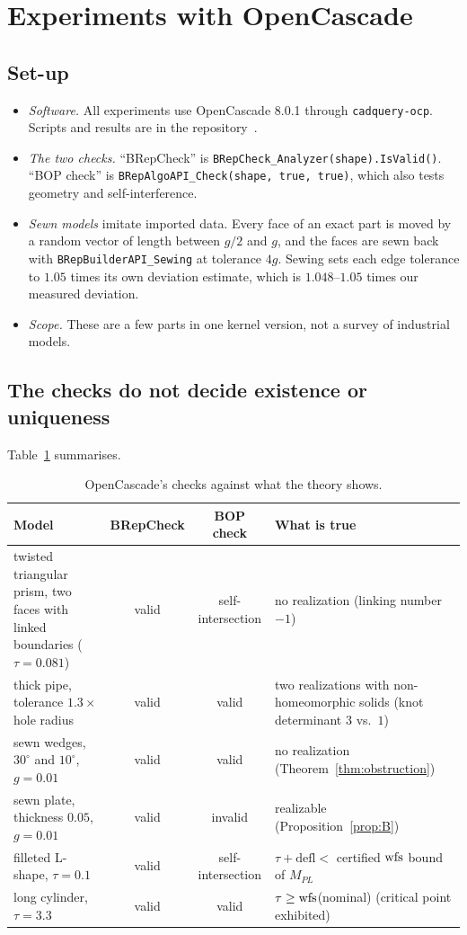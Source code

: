\section{Experiments with OpenCascade}\label{sec:experiments}

\subsection{Set-up}
\begin{itemize}
\item \emph{Software.} All experiments use OpenCascade 8.0.1 through \texttt{cadquery-ocp}. Scripts and results are
in the repository~\cite{repo}.
\item \emph{The two checks.} ``BRepCheck'' is \texttt{BRepCheck\_Analyzer(shape).IsValid()}. ``BOP check'' is
\texttt{BRepAlgoAPI\_Check(shape, true, true)}, which also tests geometry and self-interference.
\item \emph{Sewn models} imitate imported data. Every face of an exact part is moved by a random vector of length
between $g/2$ and $g$, and the faces are sewn back with \texttt{BRepBuilderAPI\_Sewing} at tolerance $4g$. Sewing
sets each edge tolerance to $1.05$ times its own deviation estimate, which is $1.048$--$1.05$ times our measured
deviation.
\item \emph{Scope.} These are a few parts in one kernel version, not a survey of industrial models.
\end{itemize}

\subsection{The checks do not decide existence or uniqueness}
Table~\ref{tab:occ} summarises.

\begin{table}[h]
\centering\small
\begin{tabular}{>{\raggedright}p{4.4cm}cc>{\raggedright\arraybackslash}p{5.0cm}}
\toprule
Model & BRepCheck & BOP check & What is true \\
\midrule
twisted triangular prism, two faces with linked boundaries ($\tau=0.081$) & valid & self-intersection & no
realization (linking number $-1$) \\
thick pipe, tolerance $1.3\times$ hole radius & valid & valid & two realizations with non-homeomorphic solids
(knot determinant $3$ vs.\ $1$) \\
sewn wedges, $30^\circ$ and $10^\circ$, $g=0.01$ & valid & valid & no realization
(Theorem~\ref{thm:obstruction}) \\
sewn plate, thickness $0.05$, $g=0.01$ & valid & invalid & realizable (Proposition~\ref{prop:B}) \\
filleted L-shape, $\tau=0.1$ & valid & self-intersection & $\tau+\mathrm{defl}<$ certified $\operatorname{wfs}$ bound of
$M_{PL}$ \\
long cylinder, $\tau=3.3$ & valid & valid & $\tau\ge\operatorname{wfs}$(nominal) (critical point exhibited) \\
\bottomrule
\end{tabular}
\caption{OpenCascade's checks against what the theory shows.}\label{tab:occ}
\end{table}

